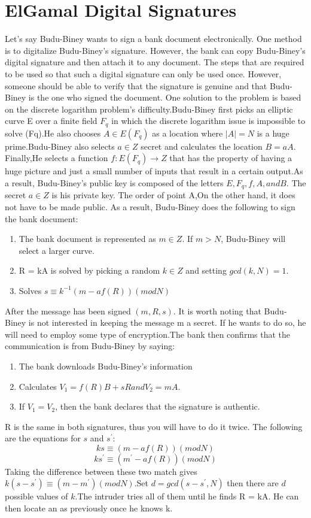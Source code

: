 \section{ElGamal Digital Signatures}
Let's say Budu-Biney wants to sign a bank document electronically. One method is to digitalize Budu-Biney's signature. However, the bank can copy Budu-Biney's digital signature and then attach it to any document. The steps that are required to be used so that such a digital signature can only be used once. However, someone should be able to verify that the signature is genuine and that Budu-Biney is the one who signed the document. One solution to the problem is based on the discrete logarithm problem's difficulty.Budu-Biney first picks an elliptic curve E over a finite field $F_{q}$ in which the discrete logarithm issue is impossible to solve (Fq).He also chooses $A \in E(F_{q})$ as a location where $|A| = N$ is a huge prime.Budu-Biney also selects $a \in Z$ secret and calculates the location $B = aA$. Finally,He selects a function $f: E(F_{q}) \longrightarrow Z$ that has the property of having a huge picture and just a small number of inputs that result in a certain output.As a result, Budu-Biney's public key is composed of the letters $E, F_{q}, f, A, and B$. The secret $a \in Z$ is his private key. The order of point A,On the other hand, it does not have to be made public. As a result, Budu-Biney does the following to sign the bank document:
\begin{enumerate}
\item The bank document is represented as $m \in Z$. If $m > N$, Budu-Biney will select a larger curve.
\item R = kA is solved by picking a random $k \in Z$ and setting $gcd(k, N) = 1$.
\item Solves $s\equiv k^{-1}(m-af(R))(mod N)$
\end{enumerate}
After the message has been signed $(m, R, s)$. It is worth noting that Budu-Biney is not interested in keeping the message m a secret. If he wants to do so, he will need to employ some type of encryption.The bank then confirms that the communication is from Budu-Biney by saying:
\begin{enumerate}
\item The bank downloads Budu-Biney's information
\item Calculates $V_{1} = f(R)B + sR and V_{2} = mA.$
\item If $V_{1} = V_{2}$, then the bank declares that the signature is authentic.
\end{enumerate}
R is the same in both signatures, thus you will have to do it twice. The following are the equations for $s$ and $s^{'}:$
$$ks\equiv(m-af(R))(mod N)$$
$$ks^{'}\equiv(m^{'}-af(R))(mod N)$$
Taking the difference between these two match gives $k(s-s^{'})\equiv(m-m^{'})(mod N)$.Set $d=gcd(s-s^{'},N)$ then there are $d$ possible values of $k$.The intruder tries all of them until he finds R = kA. He can then locate an as previously once he knows k.







